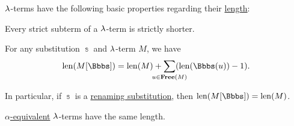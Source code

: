 \begin{proposition}\label{thm:def:lambda_term_length}
  \( {\mathrm \lambda} \)-terms have the following basic properties regarding their \hyperref[def:lambda_term_length]{length}:
  \begin{thmenum}
     Every strict subterm of a \( {\mathrm \lambda} \)-term is strictly shorter.

     For any substitution \( \Bbbs \) and \( {\mathrm \lambda} \)-term \( M \), we have
    \begin{equation}\label{eq:thm:def:lambda_term_length/substitution}
      \len(M[\Bbbs]) = \len(M) + \sum_{\mathclap{u \in \op*{Free}(M)}} (\len(\Bbbs(u)) - 1).
    \end{equation}

    In particular, if \( \Bbbs \) is a \hyperref[def:lambda_renaming]{renaming substitution}, then \( \len(M[\Bbbs]) = \len(M) \).

     \hyperref[def:lambda_term_alpha_equivalence]{\( \alpha \)-equivalent}  \( {\mathrm \lambda} \)-terms have the same length.
  \end{thmenum}
\end{proposition}
